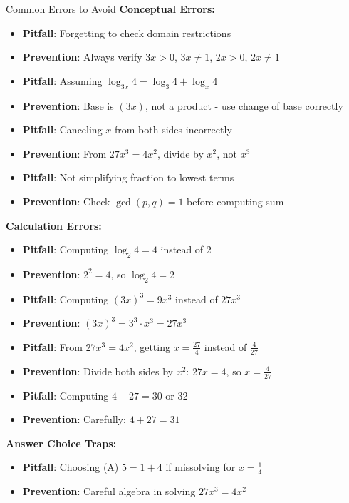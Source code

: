 \documentclass[12pt]{article}
\begin{document}
\begin{highlightbox}{Common Errors to Avoid}
\textbf{Conceptual Errors:}
\begin{itemize}
    \item \textbf{Pitfall}: Forgetting to check domain restrictions
    \item \textbf{Prevention}: Always verify $3x > 0$, $3x \neq 1$, $2x > 0$, $2x \neq 1$
    
    \item \textbf{Pitfall}: Assuming $\log_{3x} 4 = \log_3 4 + \log_x 4$
    \item \textbf{Prevention}: Base is $(3x)$, not a product - use change of base correctly
    
    \item \textbf{Pitfall}: Canceling $x$ from both sides incorrectly
    \item \textbf{Prevention}: From $27x^3 = 4x^2$, divide by $x^2$, not $x^3$
    
    \item \textbf{Pitfall}: Not simplifying fraction to lowest terms
    \item \textbf{Prevention}: Check $\gcd(p,q) = 1$ before computing sum
\end{itemize}

\textbf{Calculation Errors:}
\begin{itemize}
    \item \textbf{Pitfall}: Computing $\log_2 4 = 4$ instead of $2$
    \item \textbf{Prevention}: $2^2 = 4$, so $\log_2 4 = 2$
    
    \item \textbf{Pitfall}: Computing $(3x)^3 = 9x^3$ instead of $27x^3$
    \item \textbf{Prevention}: $(3x)^3 = 3^3 \cdot x^3 = 27x^3$
    
    \item \textbf{Pitfall}: From $27x^3 = 4x^2$, getting $x = \frac{27}{4}$ instead of $\frac{4}{27}$
    \item \textbf{Prevention}: Divide both sides by $x^2$: $27x = 4$, so $x = \frac{4}{27}$
    
    \item \textbf{Pitfall}: Computing $4 + 27 = 30$ or $32$
    \item \textbf{Prevention}: Carefully: $4 + 27 = 31$
\end{itemize}

\textbf{Answer Choice Traps:}
\begin{itemize}
    \item \textbf{Pitfall}: Choosing (A) $5 = 1 + 4$ if missolving for $x = \frac{1}{4}$
    \item \textbf{Prevention}: Careful algebra in solving $27x^3 = 4x^2$
    

\end{itemize}
\end{highlightbox}
\end{document}
